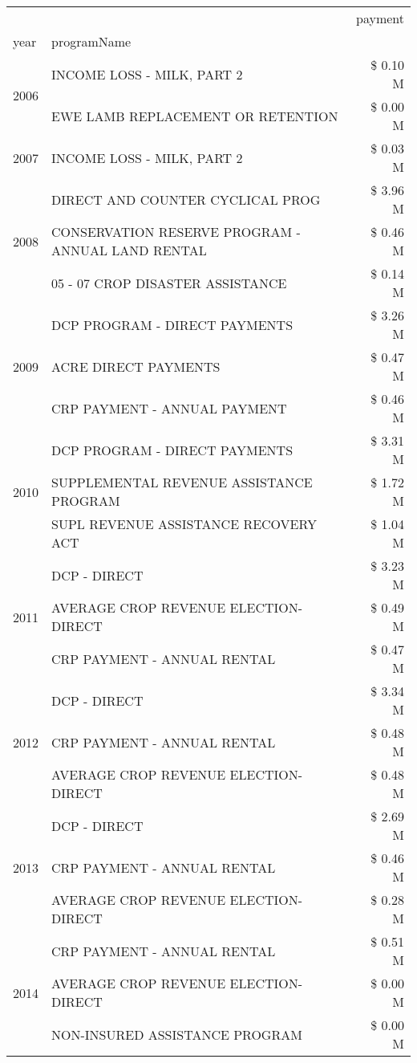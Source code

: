 \begin{tabular}{llr}
\toprule
 &  & payment \\
year & programName &  \\
\midrule
\multirow[t]{2}{*}{2006} & INCOME LOSS - MILK, PART 2 & \$ 0.10 M \\
 & EWE LAMB REPLACEMENT OR RETENTION & \$ 0.00 M \\
\cline{1-3}
2007 & INCOME LOSS - MILK, PART 2 & \$ 0.03 M \\
\cline{1-3}
\multirow[t]{3}{*}{2008} & DIRECT AND COUNTER CYCLICAL PROG & \$ 3.96 M \\
 & CONSERVATION RESERVE PROGRAM - ANNUAL LAND RENTAL & \$ 0.46 M \\
 & 05 - 07 CROP DISASTER ASSISTANCE & \$ 0.14 M \\
\cline{1-3}
\multirow[t]{3}{*}{2009} & DCP PROGRAM - DIRECT PAYMENTS & \$ 3.26 M \\
 & ACRE DIRECT PAYMENTS & \$ 0.47 M \\
 & CRP PAYMENT - ANNUAL PAYMENT & \$ 0.46 M \\
\cline{1-3}
\multirow[t]{3}{*}{2010} & DCP PROGRAM - DIRECT PAYMENTS & \$ 3.31 M \\
 & SUPPLEMENTAL REVENUE ASSISTANCE PROGRAM & \$ 1.72 M \\
 & SUPL REVENUE ASSISTANCE RECOVERY ACT & \$ 1.04 M \\
\cline{1-3}
\multirow[t]{3}{*}{2011} & DCP - DIRECT & \$ 3.23 M \\
 & AVERAGE CROP REVENUE ELECTION-DIRECT & \$ 0.49 M \\
 & CRP PAYMENT - ANNUAL RENTAL & \$ 0.47 M \\
\cline{1-3}
\multirow[t]{3}{*}{2012} & DCP - DIRECT & \$ 3.34 M \\
 & CRP PAYMENT - ANNUAL RENTAL & \$ 0.48 M \\
 & AVERAGE CROP REVENUE ELECTION-DIRECT & \$ 0.48 M \\
\cline{1-3}
\multirow[t]{3}{*}{2013} & DCP - DIRECT & \$ 2.69 M \\
 & CRP PAYMENT - ANNUAL RENTAL & \$ 0.46 M \\
 & AVERAGE CROP REVENUE ELECTION-DIRECT & \$ 0.28 M \\
\cline{1-3}
\multirow[t]{3}{*}{2014} & CRP PAYMENT - ANNUAL RENTAL & \$ 0.51 M \\
 & AVERAGE CROP REVENUE ELECTION-DIRECT & \$ 0.00 M \\
 & NON-INSURED ASSISTANCE PROGRAM & \$ 0.00 M \\

\end{tabular}
